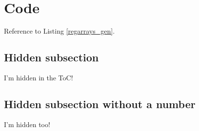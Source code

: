 
\section{Code}

Reference to Listing \ref{regarrays_gen}.

\label{regarrays}
\lstset{style=verilog-style}



\label{regarrays_gen}
\lstset{style=verilog-style}



\pagebreak

\subsection{Hidden subsection}
I'm hidden in the ToC! \cite{Albrecht2010}

\subsection*{Hidden subsection without a number}
I'm hidden too! \cite{Albrecht2010_IEICE}

